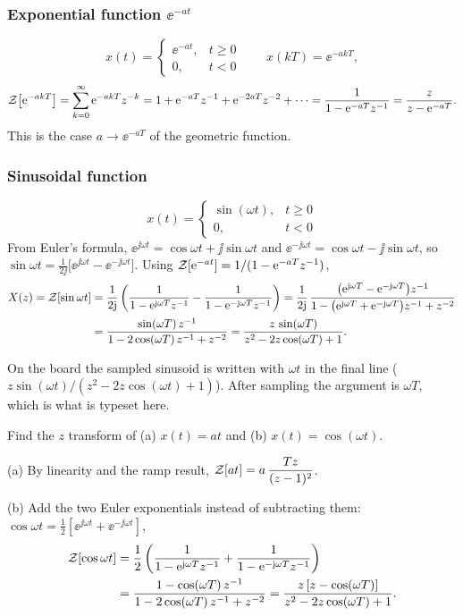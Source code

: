 \subsubsection*{Exponential function $\ee^{-at}$}
\[
  x(t)=\begin{cases}\ee^{-at},&t\ge0\\0,&t<0\end{cases}\qquad x(kT)=\ee^{-akT},
\]
\begin{equation}
  \mathcal{Z}\!\left[\mathrm{e}^{-akT}\right]=\sum_{k=0}^{\infty}\mathrm{e}^{-akT}z^{-k}=1+\mathrm{e}^{-aT}z^{-1}+\mathrm{e}^{-2aT}z^{-2}+\cdots
  =\frac{1}{1-\mathrm{e}^{-aT}z^{-1}}=\frac{z}{z-\mathrm{e}^{-aT}}.
\end{equation}
This is the case $a\to\ee^{-aT}$ of the geometric function.

\subsubsection*{Sinusoidal function}
\[
  x(t)=\begin{cases}\sin(\omega t),&t\ge0\\0,&t<0\end{cases}
\]
From Euler's formula, $\ee^{\jj\omega t}=\cos\omega t+\jj\sin\omega t$ and
$\ee^{-\jj\omega t}=\cos\omega t-\jj\sin\omega t$, so $\sin\omega t=\tfrac{1}{2\jj}\bigl[\ee^{\jj\omega t}-\ee^{-\jj\omega t}\bigr]$.
Using $\mathcal{Z}\!\left[\mathrm{e}^{-at}\right]=1/(1-\mathrm{e}^{-aT}z^{-1})$,
\begin{align}
  X(z)=\mathcal{Z}\!\left[\sin\omega t\right]
  &=\frac{1}{2\mathrm{j}}\left(\frac{1}{1-\mathrm{e}^{\mathrm{j}\omega T}z^{-1}}-\frac{1}{1-\mathrm{e}^{-\mathrm{j}\omega T}z^{-1}}\right)
   =\frac{1}{2\mathrm{j}}\,\frac{\bigl(\mathrm{e}^{\mathrm{j}\omega T}-\mathrm{e}^{-\mathrm{j}\omega T}\bigr)z^{-1}}
        {1-\bigl(\mathrm{e}^{\mathrm{j}\omega T}+\mathrm{e}^{-\mathrm{j}\omega T}\bigr)z^{-1}+z^{-2}}\notag\\
  &=\frac{\sin(\omega T)\,z^{-1}}{1-2\cos(\omega T)\,z^{-1}+z^{-2}}
   =\frac{z\,\sin(\omega T)}{z^{2}-2z\cos(\omega T)+1}.
\end{align}

\begin{boardnote}
On the board the sampled sinusoid is written with $\omega t$ in the final line
($z\sin(\omega t)/(z^{2}-2z\cos(\omega t)+1)$). After sampling the argument is $\omega T$, which is what
is typeset here.
\end{boardnote}

\begin{bexercise}
Find the $z$ transform of (a) $x(t)=at$ and (b) $x(t)=\cos(\omega t)$.
\end{bexercise}
\begin{addsol}
(a) By linearity and the ramp result, $\mathcal{Z}\!\left[at\right]=a\,\dfrac{Tz}{(z-1)^{2}}$.

(b) Add the two Euler exponentials instead of subtracting them: $\cos\omega t=\tfrac12[\ee^{\jj\omega t}+\ee^{-\jj\omega t}]$,
\begin{align*}
  \mathcal{Z}\!\left[\cos\omega t\right]&=\frac12\left(\frac{1}{1-\mathrm{e}^{\mathrm{j}\omega T}z^{-1}}+\frac{1}{1-\mathrm{e}^{-\mathrm{j}\omega T}z^{-1}}\right)\\
  &=\frac{1-\cos(\omega T)\,z^{-1}}{1-2\cos(\omega T)\,z^{-1}+z^{-2}}
  =\frac{z\,[z-\cos(\omega T)]}{z^{2}-2z\cos(\omega T)+1}.
\end{align*}
\end{addsol}

